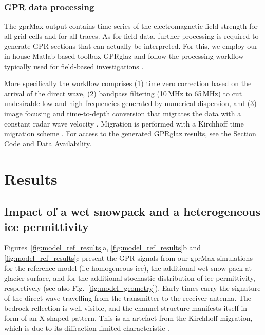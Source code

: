 \subsubsection{GPR data processing}

The gprMax output contains time series of the electromagnetic field strength for all grid cells and for all traces. As for field data, further processing is required to generate GPR sections that can actually be interpreted. For this, we employ our in-house Matlab-based toolbox GPRglaz \citep{Grab&al2018} and follow the processing workflow typically used for field-based investigations \citep[e.g.][]{Church&al2020,Grab&al2021}. 

More specifically the workflow comprises (1) time zero correction based on the arrival of the direct wave, (2) bandpass filtering (10\,MHz to 65\,MHz) to cut undesirable low and high frequencies generated by numerical dispersion, and (3) image focusing and time-to-depth conversion that migrates the data with a constant radar wave velocity \citep[0.167\,m\,ns$^{-1}$ for ice;][]{Glen&Paren1975}. Migration is performed with a Kirchhoff time migration scheme \citep{Margrave&Lamoureux2019}. For access to the generated GPRglaz results, see the Section Code and Data Availability. 


\section{Results}

\subsection{Impact of a wet snowpack and a heterogeneous ice permittivity}

Figures~\ref{fig:model_ref_results}a, \ref{fig:model_ref_results}b and \ref{fig:model_ref_results}c present the GPR-signals from our gprMax simulations for the reference model (i.e homogeneous ice), the additional wet snow pack at glacier surface, and for the additional stochastic distribution of ice permittivity, respectively (see also Fig.~\ref{fig:model_geometry}). Early times carry the signature of the direct wave travelling from the transmitter to the receiver antenna. The bedrock reflection is well visible, and the channel structure manifests itself in form of an X-shaped pattern. This is an artefact from the Kirchhoff migration, which is due to its diffraction-limited characteristic \citep{Ozdemir&al2014}.



